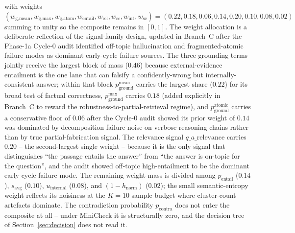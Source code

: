 with weights $(w_{\text{g,mean}}, w_{\text{g,max}}, w_{\text{g,atom}}, w_{\text{entail}}, w_{\text{rel}}, w_{\text{sc}}, w_{\text{int}}, w_{\text{se}}) = (0.22, 0.18, 0.06, 0.14, 0.20, 0.10, 0.08, 0.02)$ summing to unity so the composite remains in $[0, 1]$. The weight allocation is a deliberate reflection of the signal-family design, updated in Branch~C after the Phase-1a Cycle-0 audit identified off-topic hallucination and fragmented-atomic failure modes as dominant early-cycle failure sources. The three grounding terms jointly receive the largest block of mass ($0.46$) because external-evidence entailment is the one lane that can falsify a confidently-wrong but internally-consistent answer; within that block $p_{\text{ground}}^{\text{mean}}$ carries the largest share ($0.22$) for its broad test of factual correctness, $p_{\text{ground}}^{\max}$ carries $0.18$ (added explicitly in Branch~C to reward the robustness-to-partial-retrieval regime), and $p_{\text{ground}}^{\text{atomic}}$ carries a conservative floor of $0.06$ after the Cycle-0 audit showed its prior weight of $0.14$ was dominated by decomposition-failure noise on verbose reasoning chains rather than by true partial-fabrication signal. The relevance signal $q\_a\_\text{relevance}$ carries $0.20$ -- the second-largest single weight -- because it is the only signal that distinguishes ``the passage entails the answer'' from ``the answer is on-topic for the question'', and the audit showed off-topic high-entailment to be the dominant early-cycle failure mode. The remaining weight mass is divided among $p_{\text{entail}}$ ($0.14$), $s_{\text{avg}}$ ($0.10$), $u_{\text{internal}}$ ($0.08$), and $(1 - h_{\text{norm}})$ ($0.02$); the small semantic-entropy weight reflects its noisiness at the $K = 10$ sample budget where cluster-count artefacts dominate. The contradiction probability $p_{\text{contra}}$ does not enter the composite at all -- under MiniCheck it is structurally zero, and the decision tree of Section~\ref{sec:decision} does not read it.

